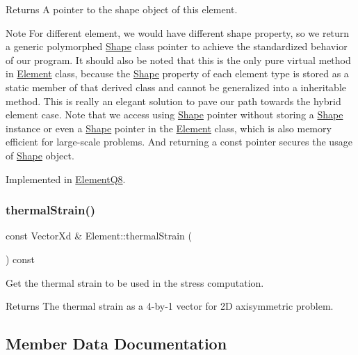 \begin{DoxyReturn}{Returns}
A pointer to the shape object of this element.
\end{DoxyReturn}
\begin{DoxyNote}{Note}
For different element, we would have different shape property, so we return a generic polymorphed \mbox{\hyperlink{class_shape}{Shape}} class pointer to achieve the standardized behavior of our program. It should also be noted that this is the only pure virtual method in \mbox{\hyperlink{class_element}{Element}} class, because the \mbox{\hyperlink{class_shape}{Shape}} property of each element type is stored as a static member of that derived class and cannot be generalized into a inheritable method. This is really an elegant solution to pave our path towards the hybrid element case. Note that we access using \mbox{\hyperlink{class_shape}{Shape}} pointer without storing a \mbox{\hyperlink{class_shape}{Shape}} instance or even a \mbox{\hyperlink{class_shape}{Shape}} pointer in the \mbox{\hyperlink{class_element}{Element}} class, which is also memory efficient for large-\/scale problems. And returning a const pointer secures the usage of \mbox{\hyperlink{class_shape}{Shape}} object. 
\end{DoxyNote}


Implemented in \mbox{\hyperlink{class_element_q8_a1d2c3824da803df5eb9cdd36acf48874}{Element\+Q8}}.

\mbox{\label{class_element_ae7d89bab030841799347a94856496f79}} 
\subsubsection{\texorpdfstring{thermal\+Strain()}{thermalStrain()}}
{\footnotesize\ttfamily const Vector\+Xd \& Element\+::thermal\+Strain (\begin{DoxyParamCaption}{ }\end{DoxyParamCaption}) const}



Get the thermal strain to be used in the stress computation. 

\begin{DoxyReturn}{Returns}
The thermal strain as a 4-\/by-\/1 vector for 2D axisymmetric problem. 
\end{DoxyReturn}


\subsection{Member Data Documentation}
\mbox{\label{class_element_a049b5df45df8a2caec4f51195e7ae7b4}} 
